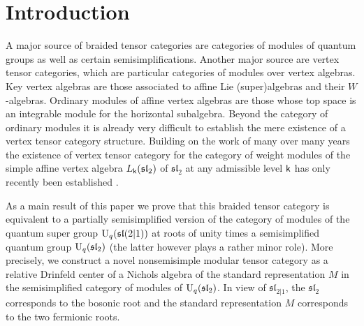\documentclass[a4paper, reqno]{amsart}
\theoremstyle{introTheorems}
\newcommand{\Ind}{\textup{Ind}}
\renewcommand\sl{\mathfrak{sl}}
\renewcommand{\1}{\mathbbold{1}}
\begin{document}
\newcommand{\monT}{{\mathsf{T}}}
\newcommand{\funT}{\Ind_\monT}
\newcommand{\monR}{{\mathsf{R}}}
\newcommand{\funR}{\Ind_{\monR}}
\newcommand{\comonC}{\mathsf{C}}
\newcommand{\comonZ}{\mathsf{Z}}
\newcommand{\funC}{\Ind_\comonC}
\newcommand{\forget}{f}

\newcommand{\funE}{E}
\newcommand{\funD}{D}
\newcommand{\funDD}{\tilde{D}}
\newcommand{\catDD}{\tilde{\catD}}

\newcommand{\fpullback}{h}

\newcommand{\cat}{\catB}

\frenchspacing

\newpage
\tableofcontents

\newpage


\section{Introduction}


A major source of braided tensor categories are categories of modules of quantum groups as well as certain semisimplifications. Another major source are vertex tensor categories, which are particular categories of modules over vertex algebras. Key vertex algebras are those associated to affine Lie (super)algebras and their $W$-algebras. Ordinary modules of affine vertex algebras are those whose top space is an integrable module for the horizontal subalgebra. Beyond the category of ordinary modules it is already  very difficult to establish the mere existence of a vertex tensor category structure. 
Building on the work of many over many years \cites{A, AM, ACK, CR1, CR2, CRW, KR, RW, Ri1, Ri2, Ri3} the existence of vertex tensor category for the category of weight modules of the simple affine vertex algebra $L_\k(\sl_2)$ of $\sl_2$ at any admissible level $\mathsf{k}$ has only recently been established \cite{Cr24}.


   

    As a main result of this paper we prove that this braided tensor category is equivalent to a partially semisimplified version of the category of modules of the quantum super group $\Uq(\sl(2|1))$ at roots of unity times a semisimplified quantum group $\Uq(\sl_2)$ (the latter however plays a rather minor role).  More precisely, we construct a novel nonsemisimple modular tensor category as a relative Drinfeld center of a Nichols algebra of the standard representation $M$ in the semisimplified category of modules of $\Uq(\sl_2)$. In view of $\sl_{2|1}$, the $\sl_2$ corresponds to the bosonic root and the standard representation $M$ corresponds to the two fermionic roots. 
\end{document}
